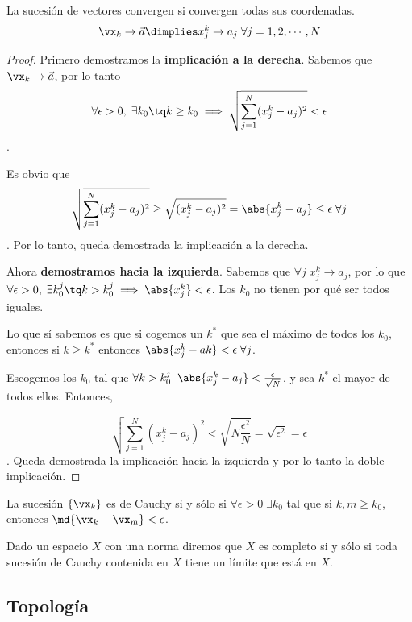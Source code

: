 \documentclass[nochap]{apuntes}
\begin{document}
\begin{theorem} La sucesión de vectores convergen si convergen todas sus coordenadas.
\[\vx_k \to \vec{a} \dimplies x_j^k\to a_j \;\forall j = 1,2,\cdots, N\]
\end{theorem}

\begin{proof}
Primero demostramos la \textbf{implicación a la derecha}. Sabemos que $\vx_k\to\vec{a}$, por lo tanto $$\forall \epsilon > 0,\; \exists k_0 \tq k\geq k_0 \implies \sqrt{\sum_{j=1}^N(x_j^k-a_j)^2}<\epsilon$$.

Es obvio que \[\sqrt{\sum_{j=1}^N(x_j^k-a_j)^2}\geq \sqrt{(x_j^k-a_j)^2} = \abs{x_j^k-a_j}\leq \epsilon \;\forall j\]. Por lo tanto, queda demostrada la implicación a la derecha.

Ahora \textbf{demostramos hacia la izquierda}. Sabemos que $\forall j\; x_j^k \to a_j$, por lo que $\forall \epsilon > 0,\; \exists k_0^j \tq k>k_0^j \implies \abs{x_j^k} < \epsilon$. Los $k_0$ no tienen por qué ser todos iguales. 

Lo que sí sabemos es que si cogemos un $k^*$ que sea el máximo de todos los $k_0$, entonces si $k\geq k^*$ entonces $\abs{x_j^k-ak}<\epsilon\; \forall j$. 

Escogemos los $k_0$ tal que $\forall k > k_0^j\;\; \abs{x_j^k-a_j}<\frac{\epsilon}{\sqrt{N}}$, y sea $k^*$ el mayor de todos ellos. Entonces, 

\[\sqrt{\sum_{j=1}^N(x_j^k-a_j)^2} < \sqrt{N\frac{\epsilon^2}{N}} = \sqrt{\epsilon^2}=\epsilon\]. Queda demostrada la implicación hacia la izquierda y por lo tanto la doble implicación.
\end{proof}

\begin{defn}
La sucesión $\{\vx_k\}$ es de Cauchy si y sólo si $\forall \epsilon > 0 \; \exists k_0$ tal que si $k,m \geq k_0$, entonces $\md{\vx_k-\vx_m}<\epsilon$.
\end{defn}

\begin{defn} Dado un espacio $X$ con una norma diremos que $X$ es completo si y sólo si toda sucesión de Cauchy contenida en $X$ tiene un límite que está en $X$.\end{defn}

\subsection{Topología}
\end{document}
